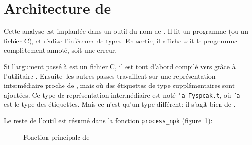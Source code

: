 
\section{Architecture de \ptrtype}
\label{sec:ptrtype-archi}

Cette analyse est implantée dans un outil du nom de \ptrtype{}. Il lit un
programme \newspeak (ou un fichier C), et réalise l'inférence de types. En
sortie, il affiche soit le programme complètement annoté, soit une erreur.


Si l'argument passé à \ptrtype{} est un fichier C, il est tout d'abord compilé
vers \newspeak grâce à l'utilitaire \ctonewspeak. Ensuite, les autres passes
travaillent sur une représentation intermédiaire proche de \newspeak, mais où
des étiquettes de type supplémentaires sont ajoutées. Ce type de représentation
intermédiaire est noté \texttt{'a Tyspeak.t}, où \texttt{'a} est le type des
étiquettes. Mais ce n'est qu'un type différent: il s'agit bien de \newspeak.



Le reste de l'outil est résumé dans la fonction
\texttt{process\_npk} (figure~\ref{fig:implem-process}):

\begin{figure}
\caption{Fonction principale de \ptrtype{}}
\label{fig:implem-process}
\end{figure}

